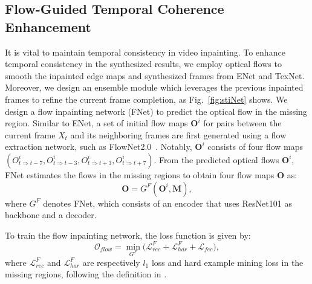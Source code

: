 \subsection{Flow-Guided Temporal Coherence Enhancement}
\label{sec:fec}
It is vital to maintain temporal consistency in video inpainting.
To enhance temporal consistency in the synthesized results, we employ optical flows to smooth the inpainted edge maps and synthesized frames from ENet and TexNet.
Moreover, we design an ensemble module which leverages the previous inpainted frames to refine the current frame completion, as Fig.~\ref{fig:stiNet} shows. 
%
We design a flow inpainting network (FNet) to predict the optical flow in the missing region.
%
Similar to ENet, a set of initial flow maps \(\boldsymbol{O}^i\) for pairs between the current frame $X_t$ and its neighboring frames are first generated using a flow extraction network, such as FlowNet2.0~\cite{Flownet_2017_CVPR}.
Notably, \(\boldsymbol{O}^i\) consists of four flow maps \((O^i_{t\Rightarrow t-7}, O^i_{t\Rightarrow t-3}, O^i_{t\Rightarrow t+3}, O^i_{t\Rightarrow t+7})\).
From the predicted optical flows $\boldsymbol{O}^i$, FNet estimates the flows in the missing regions to obtain four flow maps \(\boldsymbol{O}\) as:
\begin{equation}
	\label{eq:flownet}
	\boldsymbol{O}=G^F(\boldsymbol{O}^{i},\boldsymbol{M}),
\end{equation}
where $G^F$ denotes FNet, which consists of an encoder that uses ResNet101 \cite{He_2016_CVPR} as backbone and a decoder.

To train the flow inpainting network, the loss function is given by:
\begin{equation}
	\label{eq:flow_all}
	\mathcal{O}_{flow}=\min\limits_{G^F} \big(\mathcal{L}^F_{rec}+ \mathcal{L}^F_{har}+\mathcal{L}_{fec}\big),
\end{equation}
where $\mathcal{L}^F_{rec}$ and $\mathcal{L}^F_{har}$ are respectively $l_1$ loss and hard example mining loss in the missing regions, following the definition in \cite{Xu_2019_CVPR}. 




